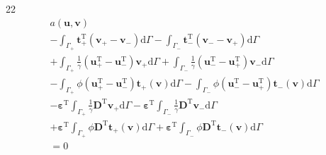 \documentclass[a4paper,12pt]{article}
\begin{document}
22
\begin{equation}
\begin{split}
a(\mathbf{u},\mathbf{v})
\\-
\int_{\Gamma_+}
\mathbf{t}_+^\textrm{T}(\mathbf{v}_+ - \mathbf{v}_-)
\textrm{d}\Gamma
-
\int_{\Gamma_-}
\mathbf{t}_-^\textrm{T}(\mathbf{v}_- - \mathbf{v}_+)
\textrm{d}\Gamma
\\+
\int_{\Gamma_+}
\frac{1}{\gamma}
(\mathbf{u}_+^\textrm{T} - \mathbf{u}_-^\textrm{T})
\mathbf{v}_+
\textrm{d}\Gamma
+
\int_{\Gamma_-}
\frac{1}{\gamma}
(\mathbf{u}_-^\textrm{T} - \mathbf{u}_+^\textrm{T})
\mathbf{v}_-
\textrm{d}\Gamma
\\-
\int_{\Gamma_+}
\phi
(\mathbf{u}_+^\textrm{T} - \mathbf{u}_-^\textrm{T})
\mathbf{t}_+(\mathbf{v})
\textrm{d}\Gamma
-
\int_{\Gamma_-}
\phi
(\mathbf{u}_-^\textrm{T} - \mathbf{u}_+^\textrm{T})
\mathbf{t}_-(\mathbf{v})
\textrm{d}\Gamma
\\-
{\boldsymbol\varepsilon}^\textrm{T}
\int_{\Gamma_+}
\frac{1}{\gamma}
\mathbf{D}^\textrm{T}
\mathbf{v}_+
\textrm{d}\Gamma
-
{\boldsymbol\varepsilon}^\textrm{T}
\int_{\Gamma_-}
\frac{1}{\gamma}
\mathbf{D}^\textrm{T}
\mathbf{v}_-
\textrm{d}\Gamma
\\+
{\boldsymbol\varepsilon}^\textrm{T}
\int_{\Gamma_+}
\phi\mathbf{D}^\textrm{T}
\mathbf{t}_+(\mathbf{v})
\textrm{d}\Gamma
+
{\boldsymbol\varepsilon}^\textrm{T}
\int_{\Gamma_-}
\phi\mathbf{D}^\textrm{T}
\mathbf{t}_-(\mathbf{v})
\textrm{d}\Gamma
\\=
0
\end{split}
\end{equation}
\end{document}

